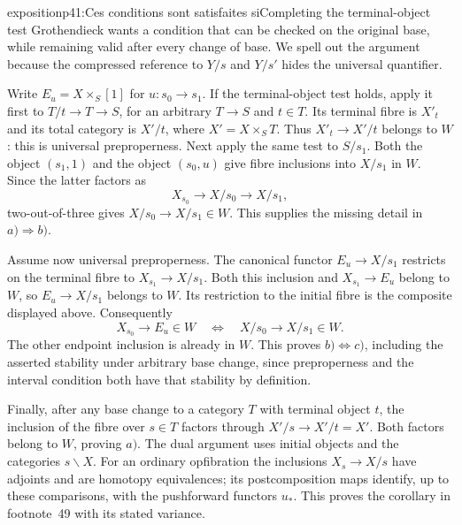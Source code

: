 \begin{dcomment}{exposition}{p41:Ces conditions sont satisfaites si}{Completing the terminal-object test}
Grothendieck wants a condition that can be checked on the original base, while remaining valid after every change of base. We spell out the argument because the compressed reference to $Y/s$ and $Y/s'$ hides the universal quantifier.

Write $E_u=X\times_S[1]$ for $u:s_0\to s_1$. If the terminal-object test holds, apply it first to $T/t\to T\to S$, for an arbitrary $T\to S$ and $t\in T$. Its terminal fibre is $X'_t$ and its total category is $X'/t$, where $X'=X\times_ST$. Thus $X'_t\to X'/t$ belongs to $W$: this is universal preproperness. Next apply the same test to $S/s_1$. Both the object $(s_1,1)$ and the object $(s_0,u)$ give fibre inclusions into $X/s_1$ in $W$. Since the latter factors as
\[
 X_{s_0}\longrightarrow X/s_0\longrightarrow X/s_1,
\]
two-out-of-three gives $X/s_0\to X/s_1\in W$. This supplies the missing detail in $a)\Rightarrow b)$.

Assume now universal preproperness. The canonical functor $E_u\to X/s_1$ restricts on the terminal fibre to $X_{s_1}\to X/s_1$. Both this inclusion and $X_{s_1}\to E_u$ belong to $W$, so $E_u\to X/s_1$ belongs to $W$. Its restriction to the initial fibre is the composite displayed above. Consequently
\[
 X_{s_0}\to E_u\in W
 \quad\Longleftrightarrow\quad
 X/s_0\to X/s_1\in W.
\]
The other endpoint inclusion is already in $W$. This proves $b)\Longleftrightarrow c)$, including the asserted stability under arbitrary base change, since preproperness and the interval condition both have that stability by definition.

Finally, after any base change to a category $T$ with terminal object $t$, the inclusion of the fibre over $s\in T$ factors through $X'/s\to X'/t=X'$. Both factors belong to $W$, proving $a)$. The dual argument uses initial objects and the categories $s\backslash X$. For an ordinary opfibration the inclusions $X_s\to X/s$ have adjoints and are homotopy equivalences; its postcomposition maps identify, up to these comparisons, with the pushforward functors $u_*$. This proves the corollary in footnote~49 with its stated variance.
\end{dcomment}

